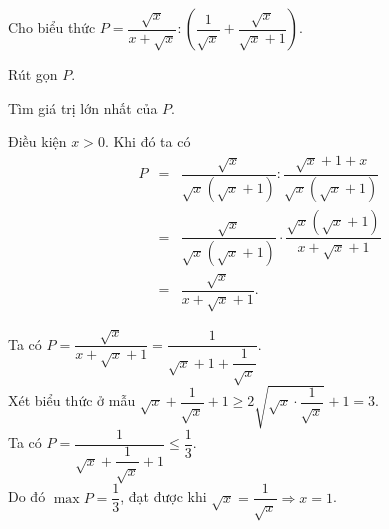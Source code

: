 \begin{bt}%
	Cho biểu thức $P=\dfrac{\sqrt{x}}{x + \sqrt{x}}:\left(\dfrac{1}{\sqrt{x}} + \dfrac{\sqrt{x}}{\sqrt{x} + 1}\right)$.
	\begin{listEX}[2]
	\item Rút gọn $P$.
	\item Tìm giá trị lớn nhất của $P$.
	\end{listEX}
	\loigiai
	{
	\begin{listEX}
	\item Điều kiện $x>0$. Khi đó ta có
	\allowdisplaybreaks 
	\begin{eqnarray*}
	P&=&\dfrac{\sqrt{x}}{\sqrt{x}(\sqrt{x}+1)} \colon \dfrac{\sqrt{x}+1+x}{\sqrt{x}(\sqrt{x}+1)}\\
	&=&\dfrac{\sqrt{x}}{\sqrt{x}(\sqrt{x}+1)} \cdot \dfrac{\sqrt{x}(\sqrt{x}+1)}{x+\sqrt{x}+1}\\
	&=&\dfrac{\sqrt{x}}{x+\sqrt{x}+1}.
	\end{eqnarray*}
	\item Ta có $P=\dfrac{\sqrt{x}}{x + \sqrt{x} + 1}=\dfrac{1}{\sqrt{x} + 1 + \dfrac{1}{\sqrt{x}}}$. \\ Xét biểu thức ở mẫu $\sqrt{x} + \dfrac{1}{\sqrt{x}} + 1\geq 2\sqrt{\sqrt{x}\cdot\dfrac{1}{\sqrt{x}}} + 1=3$.\\ Ta có $P=\dfrac{1}{\sqrt{x} + \dfrac{1}{\sqrt{x}} + 1}\leq\dfrac{1}{3}$. \\ Do đó $\max P=\dfrac{1}{3}$, đạt được khi $\sqrt{x}=\dfrac{1}{\sqrt{x}}\Rightarrow x=1$.
	\end{listEX}
	}
\end{bt}

